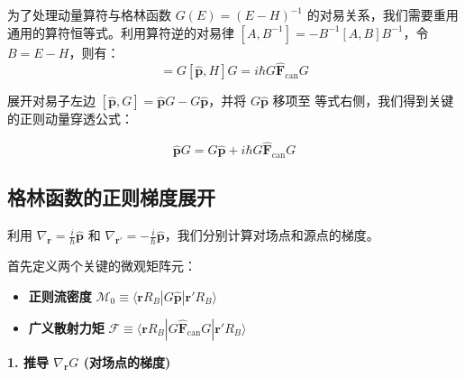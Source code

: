 \documentclass[a4paper,12pt]{article}
\begin{document}
为了处理动量算符与格林函数 $G(E) = (E-H)^{-1}$ 的对易关系，我们需要重用通用的算符恒等式。利用算符逆的对易律 $[A, B^{-1}] = -B^{-1} [A, B] B^{-1}$，令 $B = E-H$，则有：
\begin{equation}
    [\hat{\mathbf{p}}, G] = G [\hat{\mathbf{p}}, H] G = i\hbar G \hat{\mathbf{F}}_{\text{can}} G
    \label{eq:comm_p_G}
\end{equation}

展开对易子左边 $[\hat{\mathbf{p}}, G] = \hat{\mathbf{p}} G - G \hat{\mathbf{p}}$，并将 $G \hat{\mathbf{p}}$ 移项至
等式右侧，我们得到关键的正则动量穿透公式：

\begin{equation}
    \hat{\mathbf{p}} G = G \hat{\mathbf{p}} + i\hbar G \hat{\mathbf{F}}_{\text{can}} G
    \label{eq:penetration_canonical}
\end{equation}

\subsection{格林函数的正则梯度展开}

利用 $\nabla_{\mathbf{r}} = \frac{i}{\hbar} \hat{\mathbf{p}}$ 和 $\nabla_{\mathbf{r}'} = -\frac{i}{\hbar} \hat{\mathbf{p}}$，我们分别计算对场点和源点的梯度。

首先定义两个关键的微观矩阵元：
\begin{itemize}
    \item \textbf{正则流密度} $\boldsymbol{\mathcal{M}}_0 \equiv \langle \mathbf{r} R_B | G \hat{\mathbf{p}} | \mathbf{r}' R_B \rangle$
    \item \textbf{广义散射力矩} $\boldsymbol{\mathcal{F}} \equiv \langle \mathbf{r} R_B | G \hat{\mathbf{F}}_{\text{can}} G | \mathbf{r}' R_B \rangle$
\end{itemize}

\textbf{1. 推导 $\nabla_{\mathbf{r}} G$ (对场点的梯度)}
\end{document}
